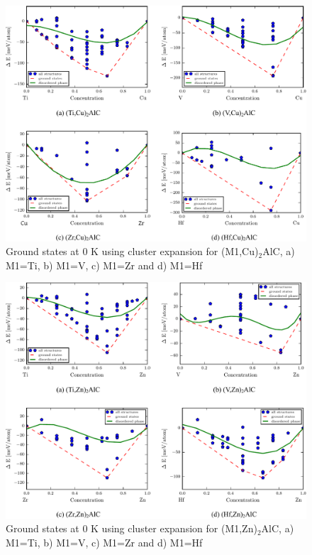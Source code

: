 \documentclass[preprint,amsmath,amssymb,aps, prb,showkeys]{revtex4-1}
\begin{document}
\begin{figure}
\centering
\includegraphics[scale=0.5]{figure_26.pdf}    
\caption{Ground states at 0 K using cluster expansion for (M1,Cu)$_2$AlC, a) M1=Ti, b) M1=V, c) M1=Zr and d) M1=Hf }
\end{figure}


\begin{figure}
\centering
\includegraphics[scale=0.5]{figure_27.pdf}   
\caption{Ground states at 0 K using cluster expansion for (M1,Zn)$_2$AlC, a) M1=Ti, b) M1=V, c) M1=Zr and d) M1=Hf }
\end{figure}

\newpage
\end{document}
